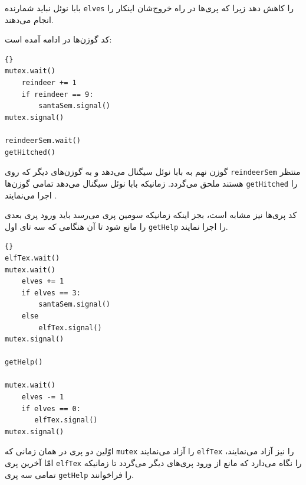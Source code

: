 \documentclass{book}
\begin{document}
    بابا نوئل نباید شمارنده {\tt elves} را کاهش دهد زیرا که پری‌ها در راه خروج‌شان اینکار را انجام می‌دهند. 

    کد گوزن‌ها در ادامه آمده است: 

\begin{latin}
\begin{lstlisting}[title=\rl{راه حل مسأله بابا نوئل (گوزن‌ها)}]{}
mutex.wait()
    reindeer += 1
    if reindeer == 9:
        santaSem.signal()
mutex.signal()

reindeerSem.wait()
getHitched()
\end{lstlisting}
\end{latin}

     گوزن نهم به بابا نوئل سیگنال می‌دهد و به گوزن‌های دیگر که روی  {\tt reindeerSem} منتظر هستند ملحق می‌گردد. 
     زمانیکه بابا نوئل سیگنال می‌دهد تمامی گوزن‌ها {\tt getHitched} را اجرا می‌نمایند .
    

    کد پری‌‌ها نیز مشابه است، بجز اینکه زمانیکه سومین پری می‌رسد باید ورود پری بعدی را مانع شود تا آن هنگامی که سه تای اول {\tt getHelp} را اجرا نمایند. 

\newpage
\begin{latin}
\begin{lstlisting}[title=\rl{راه حل مسأله بابا نوئل (پری‌ها)}]{}
elfTex.wait()
mutex.wait()
    elves += 1
    if elves == 3:
        santaSem.signal()
    else
        elfTex.signal()
mutex.signal()

getHelp()

mutex.wait()
    elves -= 1
    if elves == 0:
       elfTex.signal()
mutex.signal()
\end{lstlisting}
\end{latin}

    اوّلین دو پری  در همان زمانی که {\tt mutex} را  آزاد می‌نمایند {\tt elfTex} را نیز آزاد می‌نمایند،‌ امّا آخرین پری  {\tt elfTex} را نگاه می‌دارد که 
    مانع از ورود پری‌های دیگر می‌گردد تا زمانیکه تمامی سه پری {\tt getHelp} را فراخوانند. 
\end{document}
